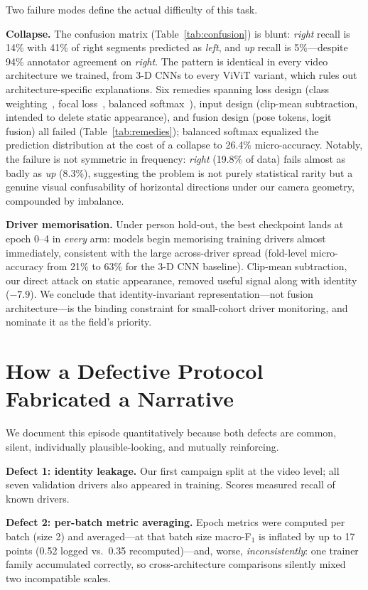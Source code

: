 \documentclass[journal]{IEEEtran}
\newcommand{\micro}{micro-accuracy}
\newcommand{\mF}{macro-F$_1$}
\begin{document}
Two failure modes define the actual difficulty of this task.

\textbf{Collapse.}  The confusion matrix (Table~\ref{tab:confusion}) is
blunt: \emph{right} recall is 14\% with 41\% of right segments predicted as
\emph{left}, and \emph{up} recall is 5\%---despite 94\% annotator agreement
on \emph{right}.  The pattern is identical in every video architecture we
trained, from 3-D CNNs to every ViViT variant, which rules out
architecture-specific explanations.  Six remedies spanning loss design
(class weighting~\cite{cui2019classbalanced}, focal
loss~\cite{lin2017focal}, balanced softmax~\cite{ren2020balanced}), input
design (clip-mean subtraction, intended to delete static appearance), and
fusion design (pose tokens, logit fusion) all failed
(Table~\ref{tab:remedies}); balanced softmax equalized the prediction
distribution at the cost of a collapse to 26.4\% \micro.  Notably, the
failure is not symmetric in frequency: \emph{right} (19.8\% of data) fails
almost as badly as \emph{up} (8.3\%), suggesting the problem is not purely
statistical rarity but a genuine visual confusability of horizontal
directions under our camera geometry, compounded by imbalance.

\textbf{Driver memorisation.}  Under person hold-out, the best checkpoint
lands at epoch 0--4 in \emph{every} arm: models begin memorising training
drivers almost immediately, consistent with the large across-driver spread
(fold-level \micro{} from 21\% to 63\% for the 3-D CNN baseline).
Clip-mean subtraction, our direct attack on static appearance, removed
useful signal along with identity ($-7.9$).  We conclude that
identity-invariant representation---not fusion architecture---is the
binding constraint for small-cohort driver monitoring, and nominate it as
the field's priority.

\section{How a Defective Protocol Fabricated a Narrative}
\label{sec:pitfalls}
We document this episode quantitatively because both defects are common,
silent, individually plausible-looking, and mutually reinforcing.

\textbf{Defect 1: identity leakage.}  Our first campaign split at the video
level; all seven validation drivers also appeared in training.  Scores
measured recall of known drivers.

\textbf{Defect 2: per-batch metric averaging.}  Epoch metrics were computed
per batch (size 2) and averaged---at that batch size \mF{} is inflated by
up to 17 points (0.52 logged vs.\ 0.35 recomputed)---and, worse,
\emph{inconsistently}: one trainer family accumulated correctly, so
cross-architecture comparisons silently mixed two incompatible scales.
\end{document}
